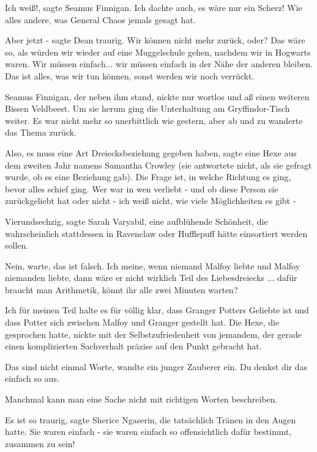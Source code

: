 \glqq Ich weiß!\grqq{}, sagte Seamus Finnigan. \glqq Ich dachte auch, es wäre
nur ein Scherz! Wie alles andere, was General Chaos jemals gesagt hat.\grqq{}

\glqq Aber jetzt -\grqq{} sagte Dean traurig. \glqq Wir können nicht mehr
zurück, oder? Das wäre so, als würden wir wieder auf eine Muggelschule gehen,
nachdem wir in Hogwarts waren. Wir müssen einfach... wir müssen einfach in der
Nähe der anderen bleiben. Das ist alles, was wir tun können, sonst werden wir
noch verrückt.\grqq{}

Seamus Finnigan, der neben ihm stand, nickte nur wortlos und aß einen weiteren
Bissen Veldbeest. Um sie herum ging die Unterhaltung am Gryffindor-Tisch weiter.
Es war nicht mehr so unerbittlich wie gestern, aber ab und zu wanderte das Thema
zurück.

\glqq Also, es muss eine Art Dreiecksbeziehung gegeben haben\grqq{}, sagte eine
Hexe aus dem zweiten Jahr namens Samantha Crowley (sie antwortete nicht, als sie
gefragt wurde, ob es eine Beziehung gab). \glqq Die Frage ist, in welche
Richtung es ging, bevor alles schief ging. Wer war in wen verliebt - und ob
diese Person sie zurückgeliebt hat oder nicht - ich weiß nicht, wie viele
Möglichkeiten es gibt -\grqq{}

\glqq Vierundsechzig\grqq{}, sagte Sarah Varyabil, eine aufblühende Schönheit,
die wahrscheinlich stattdessen in Ravenclaw oder Hufflepuff hätte einsortiert
werden sollen.

\glqq Nein, warte, das ist falsch. Ich meine, wenn niemand Malfoy liebte und
Malfoy niemanden liebte, dann wäre er nicht wirklich Teil des Liebesdreiecks ...
dafür braucht man Arithmetik, könnt ihr alle zwei Minuten warten?\grqq{}

\glqq Ich für meinen Teil halte es für völlig klar, dass Granger Potters
Geliebte ist und dass Potter sich zwischen Malfoy und Granger gestellt
hat.\grqq{} Die Hexe, die gesprochen hatte, nickte mit der Selbstzufriedenheit
von jemandem, der gerade einen komplizierten Sachverhalt präzise auf den Punkt
gebracht hat.

\glqq Das sind nicht einmal Worte\grqq{}, wandte ein junger Zauberer ein. \glqq
Du denkst dir das einfach so aus.\grqq{}

\glqq Manchmal kann man eine Sache nicht mit richtigen Worten
beschreiben.\grqq{}

\glqq Es ist so traurig\grqq{}, sagte Sherice Ngaserin, die tatsächlich Tränen
in den Augen hatte. \glqq Sie waren einfach - sie waren einfach so
offensichtlich dafür bestimmt, zusammen zu sein!\grqq{}

